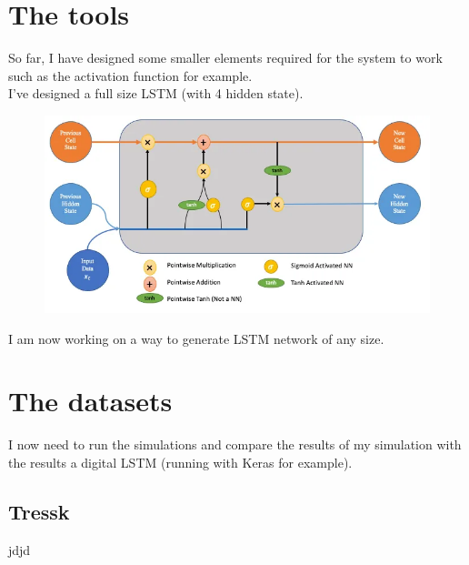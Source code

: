 \documentclass[14pt]{beamer}
\begin{document}
\section{The tools}
\begin{frame}{\insertsection}{\insertsubsection}
  So far, I have designed some smaller elements required for the system to work such as the activation function for example.\\
  I've designed a full size LSTM (with 4 hidden state).
  \begin{figure}
    \centering
    \includegraphics[height=0.35\textheight]{lstm/lstm.png}
  \end{figure}
  I am now working on a way to generate LSTM network of any size.
\end{frame}

\section{The datasets}
\begin{frame}{\insertsection}{\insertsubsection}
  I now need to run the simulations and compare the results of my simulation with the results a digital LSTM (running with Keras for example).
\end{frame}

\subsection{Tressk}
\begin{frame}{jdjd}{}
\end{frame}
\end{document}
